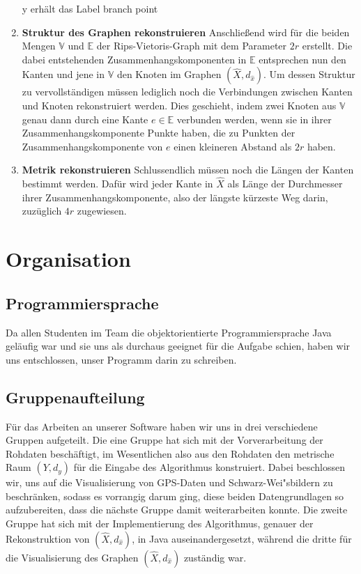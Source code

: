 \documentclass[parskip=half,
 fontsize=12pt, bibtotoc,
 ngerman]
 {article}
\begin{document}
\begin{enumerate}
\begin{algorithm}
\begin{algorithmic}
		\STATE y erhält das Label branch point
	\ENDIF
\ENDFOR
\end{algorithmic}
\end{algorithm}
\item \textbf{Struktur des Graphen rekonstruieren}\newline
Anschlie{\ss}end wird für die beiden Mengen $\mathbb{V}$ und $\mathbb{E}$ der Rips-Vietoris-Graph mit dem Parameter $2r$ erstellt. Die dabei entstehenden Zusammenhangskomponenten in $\mathbb{E}$ entsprechen nun den Kanten und jene in $\mathbb{V}$ den Knoten im Graphen $(\hat{X}, d_{\hat{x}})$. Um dessen Struktur zu vervollständigen müssen lediglich noch die Verbindungen zwischen Kanten und Knoten rekonstruiert werden. Dies geschieht, indem zwei Knoten aus  $\mathbb{V}$ genau dann durch eine Kante $e \in \mathbb{E}$ verbunden werden, wenn sie in ihrer Zusammenhangskomponente Punkte haben, die zu Punkten der Zusammenhangskomponente von $e$ einen kleineren Abstand als $2r$ haben.

\item \textbf{Metrik rekonstruieren}\newline
Schlussendlich müssen noch die Längen der Kanten bestimmt werden. Dafür wird jeder Kante in $\hat{X}$ als Länge der Durchmesser ihrer Zusammenhangskomponente, also der längste kürzeste Weg darin, zuzüglich $4r$ zugewiesen.
\end{enumerate} 


\section{Organisation}
\subsection{Programmiersprache}
Da allen Studenten im Team die objektorientierte Programmiersprache Java geläufig war und sie uns als durchaus geeignet für die Aufgabe schien, haben wir uns entschlossen, unser Programm darin zu schreiben.

\subsection{Gruppenaufteilung}
Für das Arbeiten an unserer Software haben wir uns in drei verschiedene Gruppen aufgeteilt. Die eine Gruppe hat sich mit der Vorverarbeitung der Rohdaten beschäftigt, im Wesentlichen also aus den Rohdaten den metrische Raum $\left(Y, d_y\right)$ für die Eingabe des Algorithmus konstruiert. Dabei beschlossen wir, uns auf die Visualisierung von GPS-Daten und Schwarz-Wei"sbildern zu beschr\"anken, sodass es vorrangig darum ging, diese beiden Datengrundlagen so aufzubereiten, dass die nächste Gruppe damit weiterarbeiten konnte. Die zweite Gruppe hat sich mit der Implementierung des Algorithmus, genauer der Rekonstruktion von $(\hat{X}, d_{\hat{x}})$, in Java auseinandergesetzt, während die dritte für die Visualisierung des Graphen $(\hat{X}, d_{\hat{x}})$ zuständig war.
\end{document}
